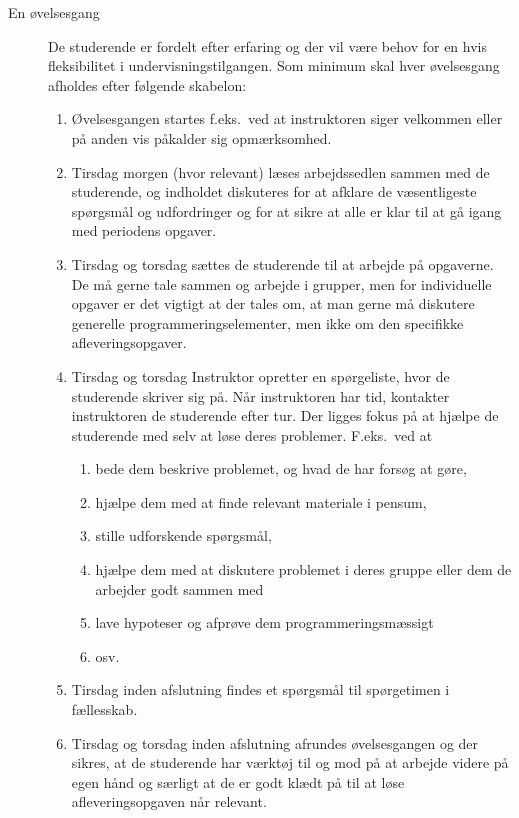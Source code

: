 \documentclass[a4paper]{article}
\begin{document}
\begin{description}
\item[En øvelsesgang] De studerende er fordelt efter erfaring og der
  vil være behov for en hvis fleksibilitet i
  undervisningstilgangen. Som minimum skal hver øvelsesgang afholdes
  efter følgende skabelon:
  \begin{enumerate}
  \item Øvelsesgangen startes f.eks.\ ved at instruktoren siger
    velkommen eller på anden vis påkalder sig opmærksomhed.
  \item Tirsdag morgen (hvor relevant) læses arbejdssedlen sammen med
    de studerende, og indholdet diskuteres for at afklare de
    væsentligeste spørgsmål og udfordringer og for at sikre at alle er
    klar til at gå igang med periodens opgaver.
  \item Tirsdag og torsdag sættes de studerende til at arbejde på
    opgaverne. De må gerne tale sammen og arbejde i grupper, men for
    individuelle opgaver er det vigtigt at der tales om, at man gerne
    må diskutere generelle programmeringselementer, men ikke om den
    specifikke afleveringsopgaver.
  \item Tirsdag og torsdag Instruktor opretter en spørgeliste, hvor de studerende skriver
    sig på. Når instruktoren har tid, kontakter instruktoren de
    studerende efter tur. Der ligges fokus på at hjælpe de studerende
    med selv at løse deres problemer. F.eks.\ ved at
    \begin{enumerate}
    \item bede dem beskrive problemet, og hvad de har forsøg at gøre,
    \item hjælpe dem med at finde relevant materiale i pensum,
    \item stille udforskende spørgsmål, 
    \item hjælpe dem med at diskutere problemet i deres gruppe eller
      dem de arbejder godt sammen med
    \item lave hypoteser og afprøve dem programmeringsmæssigt
    \item osv.
    \end{enumerate}
  \item Tirsdag inden afslutning findes et spørgsmål til spørgetimen i
    fællesskab.
  \item Tirsdag og torsdag inden afslutning afrundes øvelsesgangen og
    der sikres, at de studerende har værktøj til og mod på at arbejde
    videre på egen hånd og særligt at de er godt klædt på til at løse
    afleveringsopgaven når relevant.
  \end{enumerate}
  

\end{description}
\end{document}
